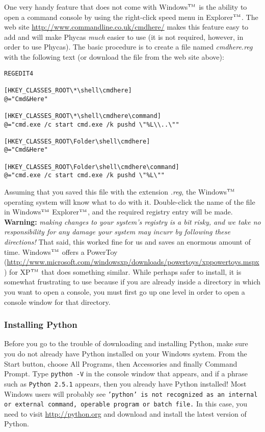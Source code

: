 \documentclass[10pt]{article}
\newcommand{\trademark}[1]{#1${}^{\mbox{\tiny TM}}$}
\newcommand{\pathname}[1]{{\em #1}}			%
\newcommand{\menu}[1]{{\sf #1}}				%
\newcommand{\code}[1]{{\tt #1}}				%
\begin{document}
One very handy feature that does not come with \trademark{Windows} is the ability to open a command console by using the right-click speed menu in \trademark{Explorer}. The web site \url{http://www.commandline.co.uk/cmdhere/} makes this feature easy to add and will make Phycas {\em much} easier to use (it is not required, however, in order to use Phycas). The basic procedure is to create a file named \pathname{cmdhere.reg} with the following text (or download the file from the web site above):
%
\begin{verbatim}
REGEDIT4

[HKEY_CLASSES_ROOT\*\shell\cmdhere]
@="Cmd&Here"

[HKEY_CLASSES_ROOT\*\shell\cmdhere\command]
@="cmd.exe /c start cmd.exe /k pushd \"%L\\..\""

[HKEY_CLASSES_ROOT\Folder\shell\cmdhere]
@="Cmd&Here"

[HKEY_CLASSES_ROOT\Folder\shell\cmdhere\command]
@="cmd.exe /c start cmd.exe /k pushd \"%L\""
\end{verbatim}
%
Assuming that you saved this file with the extension \pathname{.reg}, the \trademark{Windows} operating system will know what to do with it. Double-click the name of the file in \trademark{Windows} \trademark{Explorer}, and the required registry entry will be made. {\bfseries Warning:} {\em making changes to your system's registry is a bit risky, and we take no responsibility for any damage your system may incurr by following these directions!} That said, this worked fine for us and saves an enormous amount of time. \trademark{Windows} offers a PowerToy (\url{http://www.microsoft.com/windowsxp/downloads/powertoys/xppowertoys.mspx}) for \trademark{XP} that does something similar. While perhaps safer to install, it is somewhat frustrating to use because if you are already inside a directory in which you want to open a console, you must first go up one level in order to open a console window for that directory.

\subsubsection{Installing Python}

Before you go to the trouble of downloading and installing Python, make sure you do not already have Python installed on your Windows system. From the Start button, choose \menu{All Programs}, then \menu{Accessories} and finally \menu{Command Prompt}. Type \code{python -V} in the console window that appears, and if a phrase such as \code{Python 2.5.1} appears, then you already have Python installed! Most Windows users will probably see \code{'python' is not recognized as an internal or external command, operable program or batch file.} In this case, you need to visit \url{http://python.org} and download and install the latest version of Python.
\end{document}
